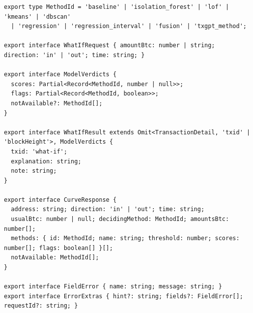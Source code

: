 \begin{lstlisting}
export type MethodId = 'baseline' | 'isolation_forest' | 'lof' | 'kmeans' | 'dbscan'
  | 'regression' | 'regression_interval' | 'fusion' | 'txgpt_method';

export interface WhatIfRequest { amountBtc: number | string; direction: 'in' | 'out'; time: string; }

export interface ModelVerdicts {
  scores: Partial<Record<MethodId, number | null>>;
  flags: Partial<Record<MethodId, boolean>>;
  notAvailable?: MethodId[];
}

export interface WhatIfResult extends Omit<TransactionDetail, 'txid' | 'blockHeight'>, ModelVerdicts {
  txid: 'what-if';
  explanation: string;
  note: string;
}

export interface CurveResponse {
  address: string; direction: 'in' | 'out'; time: string;
  usualBtc: number | null; decidingMethod: MethodId; amountsBtc: number[];
  methods: { id: MethodId; name: string; threshold: number; scores: number[]; flags: boolean[] }[];
  notAvailable: MethodId[];
}

export interface FieldError { name: string; message: string; }
export interface ErrorExtras { hint?: string; fields?: FieldError[]; requestId?: string; }
\end{lstlisting}
